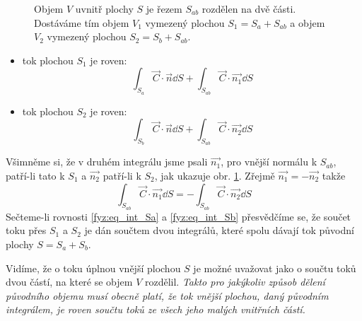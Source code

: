 {    \begin{figure}[ht!]
      \centering
      
      \caption{Objem $V$ uvnitř plochy $S$ je řezem $S_{ab}$ rozdělen na dvě části. Dostáváme tím
               objem $V_1$ vymezený plochou $S_1=S_a+S_{ab}$ a objem $V_2$ vymezený plochou
               $S_2=S_b+S_{ab}$.}
      \label{fyz:fig214}
    \end{figure}
    
    \begin{itemize}
      \item tok plochou $S_1$ je roven:
        \begin{equation}\label{fyz:eq_int_Sa}
           \int_{S_a}\vec{C}\cdot\vec{n}\dd{S} + \int_{S_{ab}}\vec{C}\cdot\vec{n_1}\dd{S}
        \end{equation}
      \item tok plochou $S_2$ je roven:
         \begin{equation}\label{fyz:eq_int_Sb}
           \int_{S_b}\vec{C}\cdot\vec{n}\dd{S} + \int_{S_{ab}}\vec{C}\cdot\vec{n_2}\dd{S}
        \end{equation}
    \end{itemize} 
    Všimněme si, že v druhém integrálu jsme psali $\vec{n_1}$, pro vnější normálu k $S_{ab}$, 
    patří-li tato k $S_1$ a $\vec{n_2}$ patří-li k $S_2$, jak ukazuje obr. \ref{fyz:fig214}. 
    Zřejmě $\vec{n_1}= -\vec{n_2}$ takže
    \begin{equation}
    \int_{S_{ab}}\vec{C}\cdot\vec{n_1}\dd{S} = - \int_{S_{ab}}\vec{C}\cdot\vec{n_2}\dd{S}
    \end{equation}
    Sečteme-li rovnosti \ref{fyz:eq_int_Sa} a \ref{fyz:eq_int_Sb} přesvědčíme se, že součet toku 
    přes $S_1$ a $S_2$ je dán součtem dvou integrálů, které spolu dávají tok původní plochy $S = 
    S_a + S_b$.
    
    Vidíme, že o toku úplnou vnější plochou $S$ je možné uvažovat jako o součtu toků dvou částí, na 
    které se objem $V$ rozdělil. \emph{Takto pro jakýkoliv způsob dělení původního objemu musí 
    obecně platí, že tok vnější plochou, daný původním integrálem, je roven součtu toků ze všech 
    jeho malých vnitřních částí.} 
    
}
